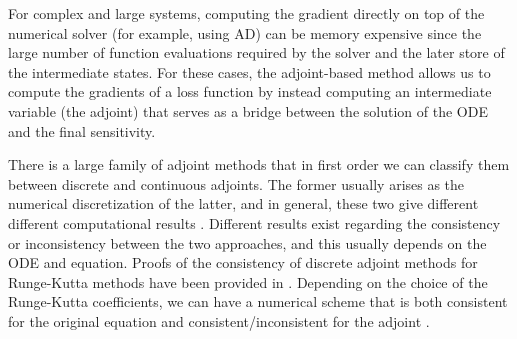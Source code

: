 For complex and large systems, computing the gradient directly on top of the numerical solver (for example, using AD) can be memory expensive since the large number of function evaluations required by the solver and the later store of the intermediate states. 
For these cases, the adjoint-based method allows us to compute the gradients of a loss function by instead computing an intermediate variable (the adjoint) that serves as a bridge between the solution of the ODE and the final sensitivity. 

There is a large family of adjoint methods that in first order we can classify them between discrete and continuous adjoints. 
The former usually arises as the numerical discretization of the latter, and in general, these two give different different computational results \cite{Sirkes_Tziperman_1997}.
Different results exist regarding the consistency or inconsistency between the two approaches, and this usually depends on the ODE and equation.  
Proofs of the consistency of discrete adjoint methods for Runge-Kutta methods have been provided in \cite{sandu2006properties, sandu2011solution}.
Depending on the choice of the Runge-Kutta coefficients, we can have a numerical scheme that is both consistent for the original equation and consistent/inconsistent for the adjoint \cite{Hager_2000}.